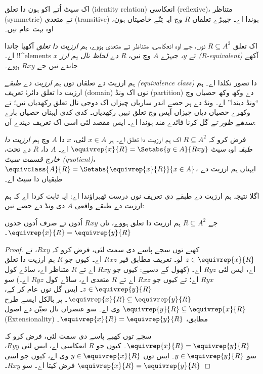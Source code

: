 \documentclass[../../../include/open-logic-section]{subfiles}
\begin{document}


اک سیٹ اُتے اکو ہون دا تعلق (identity relation) انعکاسی (reflexive)،
متناظر (symmetric) تے متعدی (transitive) ہوندا اے۔ جیہڑے تعلقاں $R$
وچ ایہ تِنّے خاصیتاں ہون، اوہ بہت عام نیں۔

\begin{defn}
اک تعلق $R \subseteq A^2$ نوں، جے اوہ انعکاسی، متناظر تے متعدی ہووے،
\emph{ہم ارزیت دا تعلق} آکھیا جاندا اے۔ !!^{element}s $x$ تے $y$، جیہڑے
$A$ وچ نیں، \emph{$R$ دے لحاظ نال ہم ارز (R-equivalent)} آکھے جاندے
نیں جے $Rxy$ ہووے۔
\end{defn}

ہم ارزیت دے تعلقاں توں \emph{ہم ارزیت دے طبقے (equivalence class)} دا تصور
نکلدا اے۔ ہم ارزیت دا تعلق دائرۂ تعریف (domain) نوں اک ونڈ (partition)
دے وکھ وکھ حصیاں وچ ``ونڈ دیندا'' اے۔ ونڈ دے ہر حصے اندر ساریاں چیزاں
اک دوجی نال تعلق رکھدیاں نیں؛ تے وکھرے حصیاں دیاں چیزاں آپس وچ تعلق
نہیں رکھدیاں۔ کدی کدی ایہناں حصیاں بارے \emph{سدھے طور تے} گل کرنا فائدے
مند ہوندا اے۔ ایس مقصد لئی اسی اک تعریف دیندے آں:

\begin{defn}
فرض کرو کہ $R \subseteq A^2$ اک ہم ارزیت دا تعلق اے۔ ہر $x \in A$ لئی،
$x$ دا $A$ وچ \emph{ہم ارزیت دا طبقہ} اوہ سیٹ $\equivrep{x}{R}
= \Setabs{y \in A}{Rxy}$ اے۔ $A$ دا، $R$ دے تحت، \emph{خارج قسمت سیٹ
(quotient)}، $\equivclass{A}{R} = \Setabs{\equivrep{x}{R}}{x \in A}$،
ایہناں ہم ارزیت دے طبقیاں دا سیٹ اے۔
\end{defn}

اگلا نتیجہ ہم ارزیت دے طبقے دی تعریف نوں درست ٹھہراؤندا اے: ایہ ثابت
کردا اے کہ ہم ارزیت دے طبقے واقعی $A$ دی ونڈ دے حصے نیں:

\begin{prop}
جے $R \subseteq A^2$ ہم ارزیت دا تعلق ہووے، تاں $Rxy$ اُدوں تے صرف اُدوں
جدوں $\equivrep{x}{R} = \equivrep{y}{R}$۔
\end{prop}

\begin{proof}
کھبے توں سجے پاسے دی سمت لئی، فرض کرو کہ $Rxy$، تے $z \in
\equivrep{x}{R}$ لو۔ تعریف مطابق فیر $Rxz$ اے۔ کیوں جو $R$ ہم ارزیت دا
تعلق اے، ایس لئی $Ryz$ اے۔ (کھول کے دسیے: کیوں جو $Rxy$ اے تے $R$
متناظر اے، ساڈے کول $Ryx$ اے؛ تے کیوں جو $Rxz$ اے تے $R$ متعدی اے،
ساڈے کول $Ryz$ اے۔) سو $z \in \equivrep{y}{R}$۔ ایس گل نوں عام کر کے،
$\equivrep{x}{R} \subseteq \equivrep{y}{R}$۔ پر بالکل ایسے طرح
$\equivrep{y}{R} \subseteq \equivrep{x}{R}$ وی اے۔ سو عنصراں نال تعیّن دے اصول
(Extensionality) مطابق، $\equivrep{x}{R} = \equivrep{y}{R}$۔

سجے توں کھبے پاسے دی سمت لئی، فرض کرو کہ $\equivrep{x}{R} =
\equivrep{y}{R}$۔ کیوں جو $R$ انعکاسی اے، ایس لئی $Ryy$، سو $y \in
\equivrep{y}{R}$۔ ایس توں $y \in \equivrep{x}{R}$ وی اے، کیوں جو اسی
$\equivrep{x}{R} = \equivrep{y}{R}$ فرض کیتا اے۔ سو $Rxy$۔
\end{proof}
\end{document}
